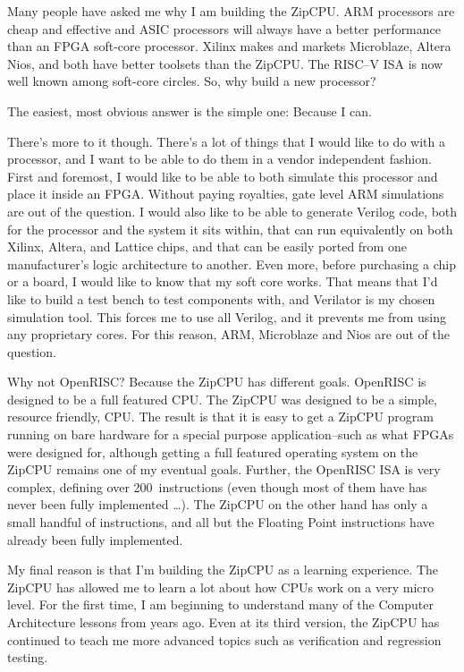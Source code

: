 \documentclass{gqtekspec}
\begin{document}
\tableofcontents
\listoffigures
\listoftables
\begin{preface}
Many people have asked me why I am building the ZipCPU. ARM processors are
cheap and effective and ASIC processors will always have a better performance
than an FPGA soft-core processor.  Xilinx makes and markets Microblaze, Altera
Nios, and both have better toolsets than the ZipCPU.  The RISC--V ISA is
now well known among soft-core circles.  So, why build a new processor?

The easiest, most obvious answer is the simple one: Because I can.

There's more to it though. There's a lot of things that I would like to do with
a processor, and I want to be able to do them in a vendor independent fashion.
First and foremost, I would like to be able to both simulate this processor
and place it inside an FPGA.  Without paying royalties, gate level ARM
simulations are out of the question.
I would also like to be able to generate Verilog code, both for the processor
and the system it sits within, that can run equivalently on both Xilinx,
Altera, and Lattice chips, and that can be easily ported from one
manufacturer's logic architecture to another.
Even more, before purchasing a chip or a board, I would like to know that my
soft core works.  That means that I'd like to build a test bench to test
components with, and Verilator is my chosen simulation tool. This forces me to
use all Verilog, and it prevents me from using any proprietary cores. For this
reason, ARM, Microblaze and Nios are out of the question.

Why not OpenRISC? Because the ZipCPU has different goals.  OpenRISC is designed
to be a full featured CPU.  The ZipCPU was designed to be a simple, resource
friendly, CPU.  The result is that it is easy to get a ZipCPU program running
on bare hardware for a special purpose application--such as what FPGAs were
designed for, although getting a full featured operating system on the ZipCPU
remains one of my eventual goals.  Further, the OpenRISC ISA is very complex,
defining over 200~instructions (even though most of them have has never been
fully implemented \ldots).  The ZipCPU on the other hand has only a small
handful of instructions, and all but the Floating Point instructions have
already been fully implemented.

My final reason is that I'm building the ZipCPU as a learning experience. The
ZipCPU has allowed me to learn a lot about how CPUs work on a very micro
level. For the first time, I am beginning to understand many of the Computer
Architecture lessons from years ago.  Even at its third version, the ZipCPU
has continued to teach me more advanced topics such as verification and
regression testing.


\end{preface}
\end{document}
